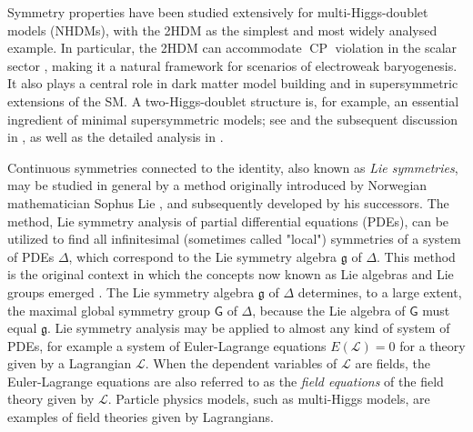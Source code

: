 \documentclass[a4paper,hidelinks, 12pt]{article}
\numberwithin{equation}{section}
\theoremstyle{plain}
\newcommand{\La}{\mathfrak}
\newcommand{\Lg}{\mathsf}
\newcommand{\mc}{\mathcal}
\newcommand{\on}{\operatorname}
\begin{document}
Symmetry properties have been studied extensively for multi-Higgs-doublet
models (NHDMs), with the 2HDM as the simplest and most widely analysed
example. In particular, the 2HDM can accommodate $\on{CP}$ violation in the
scalar sector \cite{Lee:1973iz}, making it a natural framework for scenarios
of electroweak baryogenesis. It also plays a central role in dark matter
model building and in supersymmetric extensions of the SM. A two-Higgs-doublet
structure is, for example, an essential ingredient of minimal supersymmetric
models; see \cite{Fayet:1975yh} and the subsequent discussion in
\cite{FLORES198395}, as well as the detailed analysis in
\cite{GUNION19861}.


Continuous symmetries connected to the identity, also known as \textit{Lie symmetries}, may be studied in general by a method originally introduced by Norwegian mathematician Sophus Lie \cite{Lie1893}, and subsequently developed by his successors.
The method, Lie symmetry analysis of partial differential equations (PDEs), can be utilized to find all infinitesimal (sometimes called "local") symmetries of a system of PDEs $\Delta$, which correspond to the Lie symmetry algebra $\La{g}$ of $\Delta$. This method is the original context in which the concepts now known as Lie algebras and Lie groups emerged \cite{Lie1893}. The Lie symmetry algebra $\La{g}$ of $\Delta$ determines, to a large extent, the maximal global symmetry group $\Lg{G}$ of $\Delta$, because the Lie algebra %
 of $\Lg{G}$ must equal $\La{g}$. Lie symmetry analysis  may be applied to almost any kind of system of PDEs, for example a system of Euler-Lagrange equations $E(\mc{L})=0$ for a theory given by a Lagrangian $\mc{L}$. When the dependent variables of $\mc{L}$ are fields, the Euler-Lagrange equations are also referred to as the \textit{field equations} of the field theory given by $\mc{L}$. Particle physics models, such as multi-Higgs models, are examples of field theories given by Lagrangians. 
\end{document}
